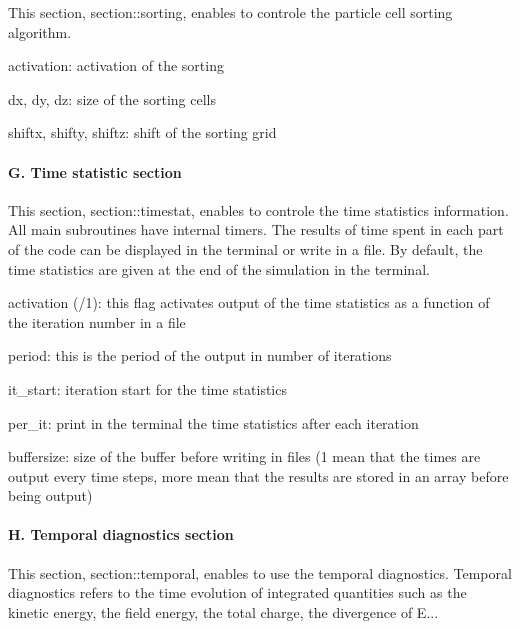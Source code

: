 This section, {\ttfamily section\+::sorting}, enables to controle the particle cell sorting algorithm.


\begin{DoxyItemize}
\item {\ttfamily activation}\+: activation of the sorting
\item {\ttfamily dx}, {\ttfamily dy}, {\ttfamily dz}\+: size of the sorting cells
\item {\ttfamily shiftx}, {\ttfamily shifty}, {\ttfamily shiftz}\+: shift of the sorting grid
\end{DoxyItemize}

\paragraph*{G. Time statistic section}

This section, {\ttfamily section\+::timestat}, enables to controle the time statistics information. All main subroutines have internal timers. The results of time spent in each part of the code can be displayed in the terminal or write in a file. By default, the time statistics are given at the end of the simulation in the terminal.


\begin{DoxyItemize}
\item {\ttfamily activation} ({/1})\+: this flag activates output of the time statistics as a function of the iteration number in a file
\item {\ttfamily period}\+: this is the period of the output in number of iterations
\item {\ttfamily it\+\_\+start}\+: iteration start for the time statistics
\item {\ttfamily per\+\_\+it}\+: print in the terminal the time statistics after each iteration
\item {\ttfamily buffersize}\+: size of the buffer before writing in files (1 mean that the times are output every time steps, more mean that the results are stored in an array before being output)
\end{DoxyItemize}

\paragraph*{H. Temporal diagnostics section}

This section, {\ttfamily section\+::temporal}, enables to use the temporal diagnostics. Temporal diagnostics refers to the time evolution of integrated quantities such as the kinetic energy, the field energy, the total charge, the divergence of E...


